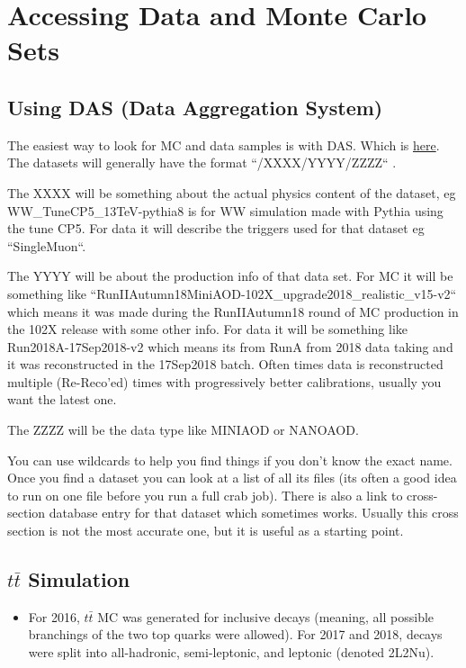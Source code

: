 \section{Accessing Data and Monte Carlo Sets}

\subsection*{Using DAS (Data Aggregation System)}

The easiest way to look for MC and data samples is with DAS. Which is \href{https://cmsweb.cern.ch/das/}{here}. 
The datasets will generally have the format ``/XXXX/YYYY/ZZZZ`` .

The XXXX will be something about the actual physics content of the dataset, eg WW\_TuneCP5\_13TeV-pythia8 is for WW simulation made with Pythia using the tune CP5. 
For data it will describe the triggers used for that dataset eg ``SingleMuon``.

The YYYY will be about the production info of that data set. 
For MC it will be something like ``RunIIAutumn18MiniAOD-102X\_upgrade2018\_realistic\_v15-v2`` which means it was made during the RunIIAutumn18 round of MC production 
in the 102X release with some other info. For data it will be something like Run2018A-17Sep2018-v2 which means its from RunA from 2018 data taking and it was reconstructed in the 17Sep2018 batch.
Often times data is reconstructed multiple (Re-Reco'ed) times with progressively better calibrations, usually you want the latest one. 

The ZZZZ will be the data type like MINIAOD or NANOAOD. 

You can use wildcards to help you find things if you don't know the exact name. 
Once you find a dataset you can look at a list of all its files  (its often a good idea to run on one file before you run a full crab job).
There is also a link to cross-section database entry for that dataset which sometimes works. Usually this cross section is not the most accurate one, but it is useful as a starting point. 


\subsection*{$t\bar{t}$ Simulation}
\begin{itemize}
    \item For 2016, $t\bar{t}$ MC was generated for inclusive decays (meaning, all possible branchings of the two top quarks were allowed). For 2017 and 2018, decays were split into all-hadronic, semi-leptonic, and leptonic (denoted 2L2Nu).
\end{itemize}
